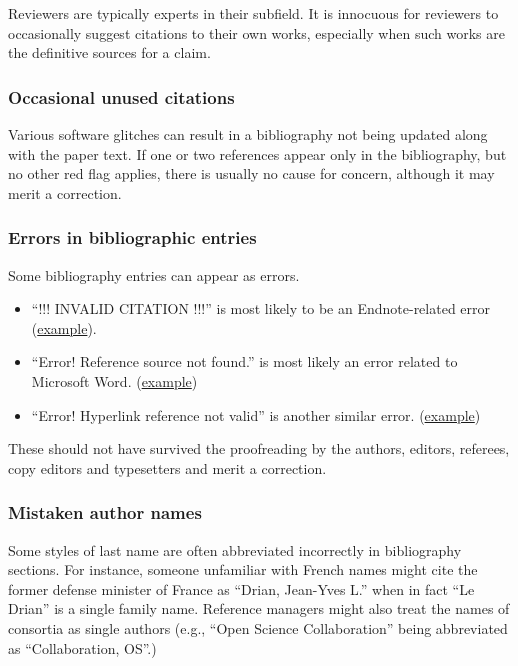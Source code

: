\documentclass[letterpaper, 12pt]{article}
\begin{document}
Reviewers are typically experts in their subfield. It is innocuous for reviewers to occasionally suggest citations to their own works, especially when such works are the definitive sources for a claim.

\subsubsection*{Occasional unused citations}

Various software glitches can result in a bibliography not being updated along with the paper text.
If one or two references appear only in the bibliography, but no other red flag applies, there is usually no cause for concern, although it may merit a correction.

\subsubsection*{Errors in bibliographic entries}

Some bibliography entries can appear as errors. 
\begin{itemize}
    \setlength\itemsep{-0.5em}
    \item ``!!! INVALID CITATION !!!'' is most likely to be an Endnote-related error (\href{https://pubpeer.com/publications/87320DD76ED35F5F3023F890C15023}{example}).  
    \item ``Error! Reference source not found.'' is most likely an error related to Microsoft Word. (\href{https://pubpeer.com/publications/1BE25CD291387136DA3474C7D97287}{example})
    \item ``Error! Hyperlink reference not valid'' is another similar error. (\href{https://pubpeer.com/publications/88516C0A7BFF973A515FD3EA842022}{example}) 
\end{itemize}

These should not have survived the proofreading by the authors, editors, referees, copy editors and typesetters and merit a correction.

\subsubsection*{Mistaken author names}

Some styles of last name are often abbreviated incorrectly in bibliography sections.
For instance, someone unfamiliar with French names might cite the former defense minister of France as ``Drian, Jean-Yves L.''
when in fact ``Le Drian'' is a single family name. Reference managers might also treat the names of consortia as single authors (e.g., ``Open Science Collaboration'' being abbreviated as ``Collaboration, OS''.)
\end{document}
